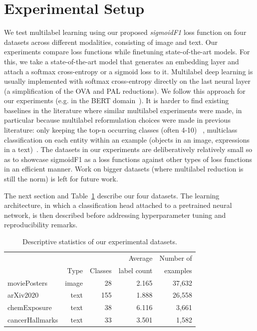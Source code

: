 
\section{Experimental Setup}
\label{sec:orgb44ba25}

We test multilabel learning using our proposed \emph{sigmoidF1} loss function on four datasets across different modalities, consisting of image and text.
%
Our experiments compare loss functions while finetuning state-of-the-art models. For this, we take a state-of-the-art model that generates an embedding layer and attach a softmax cross-entropy or a sigmoid loss to it. Multilabel deep learning is usually implemented with softmax cross-entropy directly on the last neural layer (a simplification of the OVA and PAL reductions). We follow this approach for our experiments (e.g. in the BERT domain~\cite{bigBird, BERT}). It is harder to find existing baselines in the literature where similar multilabel experiments were made, in particular because multilabel reformulation choices were made in previous literature: only keeping the top-n occurring classes (often 4-10) ~\cite[e.g.][]{textClassificationLeCun, CUNHA}, multiclass classification on each entity within an example (objects in an image, expressions in a text)~\cite[e.g.][]{COCO, multilabelImage1, multilabelImage2, multilabelImage3}. The datasets in our experiments are deliberatively relatively small so as to showcase sigmoidF1 as a loss functions against other types of loss functions in an efficient manner. Work on bigger datasets (where multilabel reduction is still the norm) is left for future work.

The next section and Table~\ref{table:datasets} describe our four datasets. The learning architecture, in which a classification head attached to a pretrained neural network, is then described before addressing hyperparameter tuning and reproducibility remarks.

\begin{table}[b]
\caption{Descriptive statistics of our experimental datasets.}
\label{table:datasets}
\centering
\begin{tabular}{l rrrr}
\toprule
& & & Average & Number of \\
& Type & Classes & label count & examples \\
\midrule
moviePosters & image & 28 & 2.165 & 37,632\\
arXiv2020 & text & 155 & 1.888 & 26,558\\
chemExposure & text & 38 & 6.116 & 3,661\\
cancerHallmarks\hspace{-.7em}  & text & 33 & 3.501 & 1,582\\
\bottomrule
\end{tabular}
\end{table}

